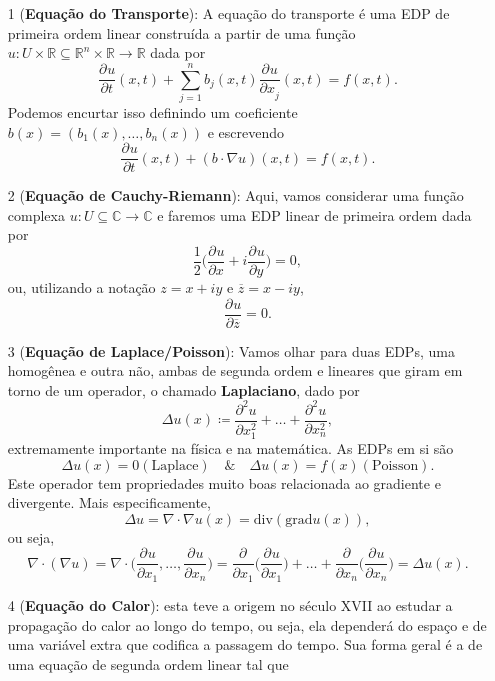 \documentclass[../pde_notes.tex]{subfiles}
\begin{document}
\begin{example}
	\begin{itemize}

		\item[1](\textbf{Equação do Transporte}): A equação do transporte é uma EDP de primeira ordem linear construída a partir de uma função \(u:U\times \mathbb{R}\subseteq \mathbb{R}^{n}\times \mathbb{R}\rightarrow \mathbb{R}\) dada por
		      \[
			      \frac{\partial^{}u}{\partial t^{}}(x, t) + \sum\limits_{j=1}^{n}b_{j}(x, t)\frac{\partial^{}u}{\partial x_{j}^{}}(x, t) = f(x, t).
		      \]
		      Podemos encurtar isso definindo um coeficiente \(b(x) = (b_{1}(x), \dotsc , b_{n}(x))\) e escrevendo
		      \[
			      \frac{\partial^{}u}{\partial t^{}}(x, t) + (b \cdot \nabla u)(x, t) = f(x, t).
		      \]
		\item[2](\textbf{Equação de Cauchy-Riemann}): Aqui, vamos considerar uma função complexa \(u:U\subseteq \mathbb{C}\rightarrow \mathbb{C}\) e faremos uma EDP linear de primeira ordem dada por
		      \[
			      \frac{1}{2}\biggl(\frac{\partial^{}u}{\partial x^{}} + i \frac{\partial^{}u}{\partial y^{}}\biggr) = 0,
		      \]
		      ou, utilizando a notação \(z = x + iy\) e \(\overline{z} = x - iy\),
		      \[
			      \frac{\partial^{}u}{\partial \overline{z}^{}} = 0.
		      \]
		\item[3](\textbf{Equação de Laplace/Poisson}): Vamos olhar para duas EDPs, uma homogênea e outra não, ambas de segunda ordem e lineares que giram em torno de um operador, o chamado \textbf{Laplaciano}, dado por
		      \[
			      \Delta u(x)\coloneqq \frac{\partial^{2}u}{\partial x_{1}^{2}}+\dotsc +\frac{\partial^{2}u}{\partial x_{n}^{2}},
		      \]
		      extremamente importante na física e na matemática. As EDPs em si são
		      \[
			      \Delta u(x) = 0 (\text{Laplace})\quad\&\quad \Delta u(x) = f(x) (\text{Poisson}).
		      \]
		      Este operador tem propriedades muito boas relacionada ao gradiente e divergente. Mais especificamente,
		      \[
			      \Delta u = \nabla \cdot \nabla{u(x)} = \mathrm{div}(\mathrm{grad}u(x)),
		      \]
		      ou seja,
		      \[
			      \nabla \cdot (\nabla{u}) = \nabla \cdot \biggl(\frac{\partial^{}u}{\partial x_{1}^{}}, \dotsc , \frac{\partial^{}u}{\partial x_{n}^{}}\biggr) = \frac{\partial^{}}{\partial x_{1}^{}}\biggl(\frac{\partial^{}u}{\partial x_{1}^{}}\biggr) + \dotsc + \frac{\partial^{}}{\partial x_{n}^{}}\biggl(\frac{\partial^{}u}{\partial x_{n}^{}}\biggr) = \Delta u(x).
		      \]
		\item[4](\textbf{Equação do Calor}): esta teve a origem no século XVII ao estudar a propagação do calor ao longo do tempo, ou seja, ela dependerá do espaço e de uma variável extra que codifica a passagem do tempo. Sua forma geral é a de uma equação de segunda ordem linear tal que

\end{itemize}
\end{example}
\end{document}

